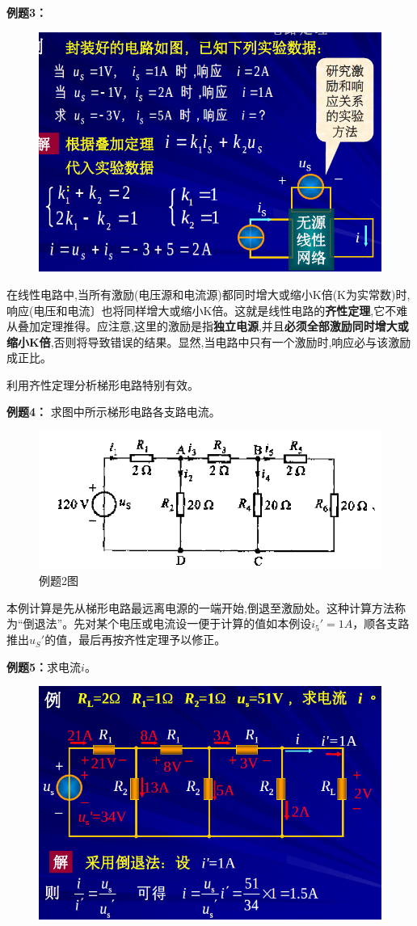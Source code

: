 \documentclass[11pt,a4paper,oneside]{book}
\begin{document}
\noindent\textbf{例题3：}
\begin{figure}[H]
	\centering
	\includegraphics[width=0.6\linewidth]{screenshot053}
	\caption{}
	\label{fig:screenshot053}
\end{figure}


在线性电路中,当所有激励(电压源和电流源)都同时增大或缩小K倍(K为实常数)时,响应(电压和电流〕也将同样增大或缩小K倍。这就是线性电路的\textbf{齐性定理},它不难从叠加定理推得。应注意,这里的激励是指\textbf{独立电源},并且\textbf{必须全部激励同时增大或缩小K倍},否则将导致错误的结果。显然,当电路中只有一个激励时,响应必与该激励成正比。

利用齐性定理分析梯形电路特别有效。

\noindent\textbf{例题4：}
求图中所示梯形电路各支路电流。
\begin{figure}[H]
	\centering
	\includegraphics[width=0.7\linewidth]{screenshot048}
	\caption{例题2图}
	\label{fig:screenshot048}
\end{figure}
本例计算是先从梯形电路最远离电源的一端开始,倒退至激励处。这种计算方法称为“倒退法”。先对某个电压或电流设一便于计算的值如本例设$i_5'=1A$，顺各支路推出$u_S'$的值，最后再按齐性定理予以修正。

\noindent\textbf{例题5：}求电流$i$。
\begin{figure}[H]
	\centering
	\includegraphics[width=0.7\linewidth]{screenshot054}
	\caption{}
	\label{fig:screenshot054}
\end{figure}
\end{document}
